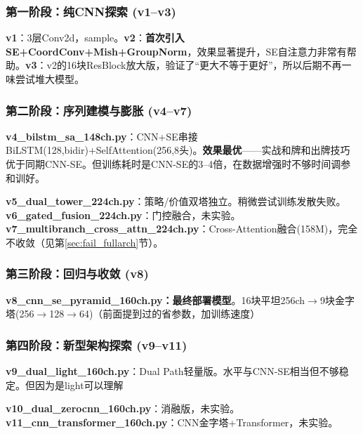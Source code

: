\documentclass{article}
\begin{document}
\subsubsection*{第一阶段：纯CNN探索 (v1--v3)}

\textbf{v1}：3层Conv2d，sample。\textbf{v2}：\textbf{首次引入SE+CoordConv+Mish+GroupNorm}，效果显著提升，SE自注意力非常有帮助。\textbf{v3}：v2的16块ResBlock放大版，验证了``更大不等于更好''，所以后期不再一味尝试堆大模型。

\subsubsection*{第二阶段：序列建模与膨胀 (v4--v7)}

\textbf{v4\_bilstm\_sa\_148ch.py}：CNN+SE串接BiLSTM(128,bidir)+SelfAttention(256,8头)。\textbf{效果最优}——实战和牌和出牌技巧优于同期CNN-SE。但训练耗时是CNN-SE的3--4倍，在数据增强时不够时间调参和训好。

\textbf{v5\_dual\_tower\_224ch.py}：策略/价值双塔独立。稍微尝试训练发散失败。\textbf{v6\_gated\_fusion\_224ch.py}：门控融合，未实验。\textbf{v7\_multibranch\_cross\_attn\_224ch.py}：Cross-Attention融合(158M)，完全不收敛（见第\ref{sec:fail_fullarch}节）。

\subsubsection*{第三阶段：回归与收敛 (v8)}

\textbf{v8\_cnn\_se\_pyramid\_160ch.py：最终部署模型}。16块平坦256ch$\rightarrow$9块金字塔(256$\rightarrow$128$\rightarrow$64)（前面提到过的省参数，加训练速度）

\subsubsection*{第四阶段：新型架构探索 (v9--v11)}

\textbf{v9\_dual\_light\_160ch.py}：Dual Path轻量版。水平与CNN-SE相当但不够稳定。但因为是light可以理解

\textbf{v10\_dual\_zerocnn\_160ch.py}：消融版，未实验。\textbf{v11\_cnn\_transformer\_160ch.py}：CNN金字塔+Transformer，未实验。
\end{document}
